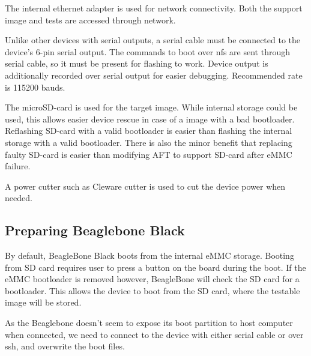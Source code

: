 \documentclass[a4paper,11pt]{article}
\begin{document}
The internal ethernet adapter is used for network connectivity. Both the support image and tests are accessed through network.

Unlike other devices with serial outputs, a serial cable must be connected to the device's 6-pin serial output. The commands to boot over nfs are sent through serial cable, so it must be present for flashing to work. Device output is additionally recorded over serial output for easier debugging. Recommended rate is 115200 bauds.

The microSD-card is used for the target image. While internal storage could be used, this allows easier device rescue in case of a image with a bad bootloader. Reflashing SD-card with a valid bootloader is easier than flashing the internal storage with a valid bootloader. There is also the minor benefit that replacing faulty SD-card is easier than modifying AFT to support SD-card after eMMC failure.

A power cutter such as Cleware cutter is used to cut the device power when needed.

\subsection{Preparing Beaglebone Black}

By default, BeagleBone Black boots from the internal eMMC storage. Booting from SD card requires user to press a button on the board during the boot. If the eMMC bootloader is removed however, BeagleBone will check the SD card for a bootloader. This allows the device to boot from the SD card, where the testable image will be stored.

As the Beaglebone doesn't seem to expose its boot partition to host computer when connected, we need to connect to the device with either serial cable or over ssh, and overwrite the boot files.
\end{document}
